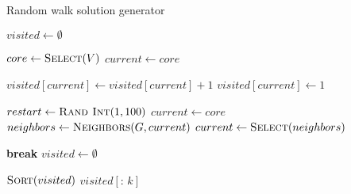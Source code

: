 \begin{algorithm}
  \caption{Random walk solution generator}\label{alg:RANDOM-WALK-SMART-INIT}
  \begin{algorithmic}[1]
    \State $visited \leftarrow \emptyset$

    \State $core \leftarrow \Call{Select}{V}$
    \State $current \leftarrow core$

    \State $visited\left[current\right] \leftarrow visited\left[current\right] + 1$
    \Else
    \State $visited\left[current\right] \leftarrow 1$
    \EndIf

    \State $restart \leftarrow \Call{Rand Int}{1, 100}$
    \State $current \leftarrow core$
    \Else
    \State $neighbors \leftarrow \Call{Neighbors}{G, current}$
    \State $current \leftarrow \Call{Select}{neighbors}$
    \EndIf
    \EndFor

    \State \textbf{break}
    \Else
    \State $visited \leftarrow \emptyset$
    \EndIf
    \EndWhile

    \State $\Call{Sort}{visited}$
    \State \Return $visited\left[ {:}\,k \right]$
    \EndFunction
  \end{algorithmic}
\end{algorithm}
